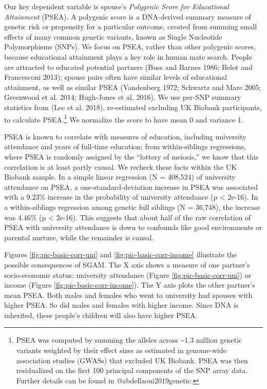 \documentclass[
]{article}
\begin{document}
Our key dependent variable is spouse's \emph{Polygenic Score for Educational
Attainment} (PSEA). A polygenic score is a DNA-derived summary measure
of genetic risk or propensity for a particular outcome, created from
summing small effects of many common genetic variants, known as Single
Nucleotide Polymorphisms (SNPs). We focus on PSEA, rather than other
polygenic scores, because educational attainment plays a key role in
human mate search. People are attracted to educated potential partners
(Buss and Barnes 1986; Belot and Francesconi 2013); spouse pairs often have
similar levels of educational attainment, as well as similar PSEA
(Vandenberg 1972; Schwartz and Mare 2005; Greenwood et al. 2014; Hugh-Jones et al. 2016). We use per-SNP summary statistics from
(Lee et al. 2018), re-estimated excluding UK Biobank participants, to
calculate PSEA.\footnote{PSEA was computed by summing the alleles across \textasciitilde1.3 million
  genetic variants weighted by their effect sizes as estimated in
  genome-wide association studies (GWASs) that excluded UK Biobank.
  PSEA was then residualized on the first 100 principal components of
  the SNP array data. Further details can be found in
  @abdellaoui2019genetic.} We normalize the score to have mean 0 and variance
1.

PSEA is known to correlate with measures of education, including
university attendance and years of full-time education; from
within-siblings regressions, where PSEA is randomly assigned by the
``lottery of meiosis,'' we know that this correlation is at least partly
causal. We recheck these facts within the UK Biobank sample. In a simple
linear regression (N = 408,524) of university attendance
on PSEA, a one-standard-deviation increase in PSEA was associated with a
9.23\% increase in the probability of
university attendance (p \textless{} 2e-16). In a within-siblings regression
among genetic full siblings (N = 36,748), the
increase was 4.46\% (p \textless{} 2e-16). This
suggests that about half of the raw correlation of PSEA with university
attendance is down to confounds like good environments or parental
nurture, while the remainder is causal.

Figures \ref{fig:pic-basic-corr-uni} and
\ref{fig:pic-basic-corr-income} illustrate the possible consequences of
SGAM. The X axis shows a measure of one partner's socio-economic status:
university attendance (Figure \ref{fig:pic-basic-corr-uni}) or income
(Figure \ref{fig:pic-basic-corr-income}). The Y axis plots the other
partner's mean PSEA. Both males and females who went to university had
spouses with higher PSEA. So did males and females with higher income.
Since DNA is inherited, these people's children will also have higher
PSEA.
\end{document}
